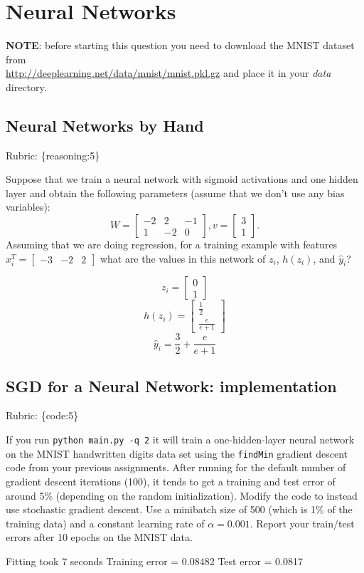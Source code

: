 \documentclass{article}
\def\rubric#1{\gre{Rubric: \{#1\}}}{}
\def\blu#1{{\color{blu}#1}}
\def\gre#1{{\color{gre}#1}}
\def\red#1{{\color{red}#1}}
\newcommand{\mat}[1]{\begin{bmatrix}#1\end{bmatrix}}
\begin{document}
\section{Neural Networks}

\textbf{NOTE}: before starting this question you need to download the MNIST dataset from \\ \url{http://deeplearning.net/data/mnist/mnist.pkl.gz} and place it in your \emph{data} directory.


\subsection{Neural Networks by Hand}
\rubric{reasoning:5}

Suppose that we train a neural network with sigmoid activations and one hidden layer and obtain the following parameters (assume that we don't use any bias variables):
\[
W = \mat{-2 & 2 & -1\\1 & -2 & 0}, v = \mat{3 \\1}.
\]
Assuming that we are doing regression, \blu{for a training example with features $x_i^T = \mat{-3 &-2 & 2}$ what are the values in this network of $z_i$, $h(z_i)$, and $\hat{y}_i$?}

\red{
\[
z_i = \mat{0\\1}
\]
\[
h(z_i) = \mat{\frac{1}{2}\\\frac{e}{e+1}}
\]
\[
\hat{y}_i = \frac{3}{2}+\frac{e}{e+1}
\]
}

\subsection{SGD for a Neural Network: implementation}
\rubric{code:5}


If you run \texttt{python main.py -q 2} it will train a one-hidden-layer neural network on the MNIST handwritten digits data set using the \texttt{findMin} gradient descent code from your previous assignments. After running for the default number of gradient descent iterations (100), it tends to get a training and test error of around 5\% (depending on the random initialization). 
\blu{Modify the code to instead use stochastic gradient descent. Use a minibatch size of 500 (which is 1\% of the training data) and a constant learning rate of $\alpha=0.001$. Report your train/test errors after 10 epochs on the MNIST data.} 

\red{
Fitting took 7 seconds \newline
Training error =  0.08482 \newline
Test error     =  0.0817
}
\end{document}
